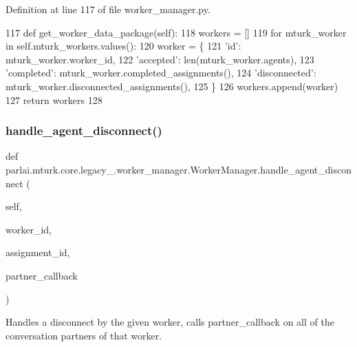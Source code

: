 Definition at line 117 of file worker\+\_\+manager.\+py.


\begin{DoxyCode}
117     \textcolor{keyword}{def }get\_worker\_data\_package(self):
118         workers = []
119         \textcolor{keywordflow}{for} mturk\_worker \textcolor{keywordflow}{in} self.mturk\_workers.values():
120             worker = \{
121                 \textcolor{stringliteral}{'id'}: mturk\_worker.worker\_id,
122                 \textcolor{stringliteral}{'accepted'}: len(mturk\_worker.agents),
123                 \textcolor{stringliteral}{'completed'}: mturk\_worker.completed\_assignments(),
124                 \textcolor{stringliteral}{'disconnected'}: mturk\_worker.disconnected\_assignments(),
125             \}
126             workers.append(worker)
127         \textcolor{keywordflow}{return} workers
128 
\end{DoxyCode}
\mbox{\label{classparlai_1_1mturk_1_1core_1_1legacy__2018_1_1worker__manager_1_1WorkerManager_a79f7899bc0a506c8c22838a522b1707c}} 
\subsubsection{\texorpdfstring{handle\+\_\+agent\+\_\+disconnect()}{handle\_agent\_disconnect()}}
{\footnotesize\ttfamily def parlai.\+mturk.\+core.\+legacy\+\_.\+worker\+\_\+manager.\+Worker\+Manager.\+handle\+\_\+agent\+\_\+disconnect (\begin{DoxyParamCaption}\item[{}]{self,  }\item[{}]{worker\+\_\+id,  }\item[{}]{assignment\+\_\+id,  }\item[{}]{partner\+\_\+callback }\end{DoxyParamCaption})}

\begin{DoxyVerb}Handles a disconnect by the given worker, calls partner_callback on all of the
conversation partners of that worker.
\end{DoxyVerb}
 

